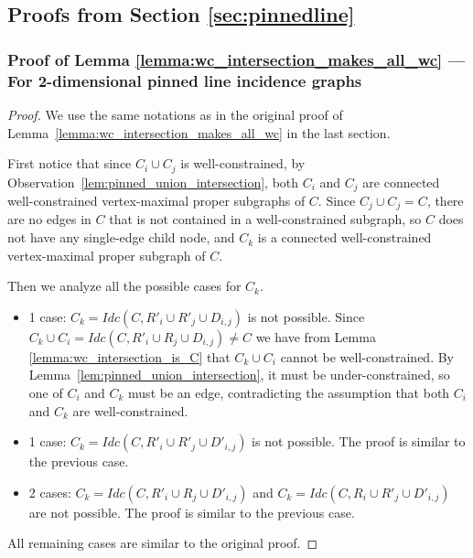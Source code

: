 \subsection{Proofs from Section \ref{sec:pinnedline}}
\subsubsection{Proof of Lemma \ref{lemma:wc_intersection_makes_all_wc} --- For 2-dimensional pinned line incidence graphs}
\label{sec:appendix_pinned}

\begin{proof} %
We use the same notations as in the original proof of Lemma~\ref{lemma:wc_intersection_makes_all_wc} in the last section.

First notice that since $C_i \cup C_j$ is well-constrained, by Observation~\ref{lem:pinned_union_intersection},
both $C_i$ and $C_j$ are connected well-constrained vertex-maximal proper subgraphs of  $C$.
Since $C_j \cup C_j = C$, there are no edges in $C$ that is not contained in a well-constrained subgraph, so $C$ does not have any single-edge child node, and $C_k$ is a connected well-constrained vertex-maximal proper subgraph of  $C$.

Then we analyze all the possible cases for $C_k$.
\begin{itemize}
    \item 1 case: $C_k=Idc(C,R'_i\cup R'_j\cup D_{i,j})$ is not possible. Since $C_k\cup C_i = Idc(C,R'_i\cup R_j\cup D_{i,j})\neq C$ we have from Lemma \ref{lemma:wc_intersection_is_C} that $C_k\cup C_i$ cannot be well-constrained.
    By Lemma~\ref{lem:pinned_union_intersection}, it must be under-constrained,
    so one of $C_i$ and $C_k$ must be an edge, contradicting the assumption that both $C_i$ and $C_k$ are well-constrained.

    \item 1 case: $C_k=Idc(C,R'_i\cup R'_j\cup D'_{i,j})$ is not possible. The proof is similar to the previous case.

    \item 2 cases: $C_k=Idc(C,R'_i\cup R_j\cup D'_{i,j})$ and $C_k=Idc(C,R_i\cup R'_j\cup D'_{i,j})$ are not possible.
    The proof is similar to the previous case.
\end{itemize}

All remaining cases are similar to the original proof.
\end{proof}


